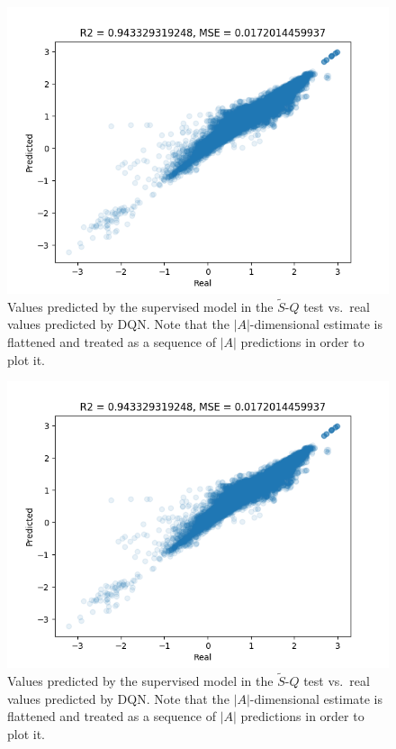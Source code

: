 %
%
\begin{figure}
    \includegraphics[width=\textwidth]{pictures/experiments/FQ_test_pong}
    \centering
    \caption[Predictions of $\tilde{S}$-$Q$ mapping experiment]{Values predicted 
	     by the supervised model in the $\tilde{S}$-$Q$ test vs.\ real 
	     values predicted by DQN. Note that the $|A|$-dimensional estimate 
	     is flattened and treated as a sequence of $|A|$ predictions in 
	     order to plot it.}
    \label{f:FQ_test_breakout}
\end{figure}
%
%
\begin{figure}
    \includegraphics[width=\textwidth]{pictures/experiments/FQ_test_pong}
    \centering
    \caption[Predictions of $\tilde{S}$-$Q$ mapping experiment]{Values predicted 
	     by the supervised model in the $\tilde{S}$-$Q$ test vs.\ real 
	     values predicted by DQN. Note that the $|A|$-dimensional estimate 
	     is flattened and treated as a sequence of $|A|$ predictions in 
	     order to plot it.}
    \label{f:FQ_test_pong}
\end{figure}
